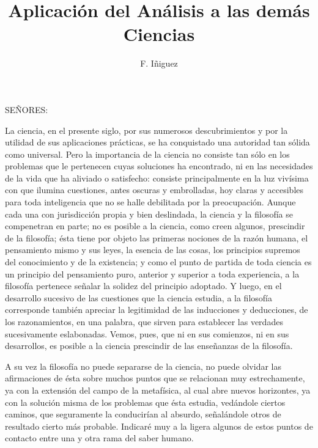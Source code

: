 \documentclass[a4paper, 12pt]{article}
\title{Aplicación del Análisis a las demás Ciencias}
\author{F. Iñiguez}
\date{}
\begin{document}
\begin{tcolorbox}[colback=blue!5!white,colframe=blue!75!black]

\vspace{-1.8cm}
\textbf \maketitle

\end{tcolorbox}

\bigskip



SEÑORES:


 La ciencia, en el presente siglo, por sus numerosos descubrimientos y por la utilidad de sus aplicaciones prácticas, se ha conquistado una autoridad tan sólida como universal. Pero la importancia de la ciencia no consiste tan sólo en los problemas que le pertenecen cuyas soluciones ha encontrado, ni en las necesidades de la vida que ha aliviado o satisfecho: consiste principalmente en la luz vivísima con que ilumina cuestiones, antes oscuras y embrolladas, hoy claras y accesibles para toda inteligencia que no se halle debilitada por la preocupación. Aunque cada una con jurisdicción propia y bien deslindada, la ciencia y la filosofía se compenetran en parte; no es posible a la ciencia, como creen algunos, prescindir de la filosofía; ésta tiene por objeto las primeras nociones de la razón humana, el pensamiento mismo y sus leyes, la esencia de las cosas, los principios supremos del conocimiento y de  la existencia; y como el punto de partida de toda ciencia es un principio del pensamiento puro, anterior y superior a toda experiencia, a la filosofía pertenece señalar la solidez del principio adoptado. Y luego, en el desarrollo sucesivo de las cuestiones que la ciencia estudia, a la filosofía corresponde también apreciar la legitimidad de las inducciones y deducciones, de los razonamientos, en una palabra, que sirven para establecer las verdades sucesivamente eslabonadas. Vemos, pues, que ni en sus comienzos, ni en sus desarrollos, es posible a la ciencia prescindir de las enseñanzas de la filosofía.

A su vez la filosofía no puede separarse de la ciencia, no puede olvidar las afirmaciones de ésta sobre muchos puntos que se relacionan muy estrechamente, ya con la extensión del campo de la metafísica, al cual abre nuevos horizontes, ya con la solución misma de los problemas que ésta estudia, vedándole ciertos caminos, que seguramente la conducirían al absurdo, señalándole otros de resultado cierto más probable. Indicaré muy a la ligera algunos de estos puntos de contacto entre una y otra rama del saber humano.
\end{document}
